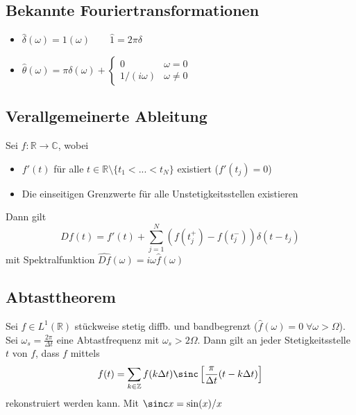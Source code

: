 \begin{sectionbox}
    \subsection{Bekannte Fouriertransformationen}
    \begin{itemize}
        \item $\hat \delta(\omega) = 1(\omega) \qquad \hat 1 = 2\pi\delta$
        \item $\hat\theta(\omega) = \pi\delta(\omega) + \begin{cases}
                      0           & \omega = 0   \\
                      1/(i\omega) & \omega \ne 0
                  \end{cases}$
    \end{itemize}
\end{sectionbox}

\subsection{Verallgemeinerte Ableitung}
\begin{emphbox}
    Sei $f:\mathbb R \rightarrow \mathbb C$, wobei
    \begin{itemize}
        \item $f'(t)$ für alle $t\in\mathbb R\setminus \{t_1 < ... < t_N\}$ existiert ($f'(t_j)=0$)
        \item Die einseitigen Grenzwerte für alle Unstetigkeitsstellen existieren
    \end{itemize}
    Dann gilt
    \begin{equation*}
        Df(t) = f'(t) + \sum_{j=1}^{N}(f(t_j^+) - f(t_j^-))\delta(t-t_j)
    \end{equation*}
    mit Spektralfunktion $\widehat{Df}(\omega) = i\omega \hat f(\omega)$
\end{emphbox}

\subsection{Abtasttheorem}
Sei $f\in L^1(\mathbb R)$ stückweise stetig diffb. und bandbegrenzt ($\hat f(\omega) = 0 \; \forall \omega >\Omega$).
Sei $\omega_s=\frac{2\pi}{\Delta t}$ eine Abtastfrequenz mit $\omega_s > 2\Omega$. Dann gilt an jeder Stetigkeitsstelle $t$ von $f$, dass $f$ mittels
\begin{equation*}
    f(t)=\sum_{k\in\mathbb Z}f(k\Delta t)\sinc\left[\frac{\pi}{\Delta t}(t-k\Delta t)\right]
\end{equation*} rekonstruiert werden kann.
Mit $\sinc x=\sin(x)/x$